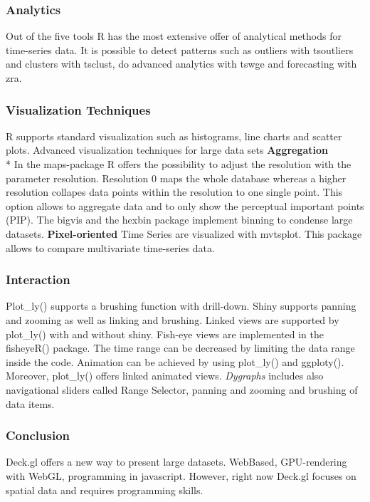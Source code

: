 \subsubsection*{Analytics}
Out of the five tools R has the most extensive offer of analytical methods for time-series data. It is possible to detect patterns such as outliers with tsoutliers\cite{Chen1993} and clusters with tsclust\cite{Manso2015}, do advanced analytics with tswge\cite{tswge} and forecasting with zra\cite{zra}.
\subsubsection*{Visualization Techniques}
R supports standard visualization such as histograms, line charts and scatter plots. Advanced visualization techniques for large data sets 
\textbf{Aggregation}\\*
In the maps-package R offers the possibility to adjust the resolution with the parameter resolution. Resolution 0 maps the whole database whereas a higher resolution collapes data points within the resolution to one single point. This option allows to aggregate data and to only show the perceptual important points (PIP).
The bigvis and the hexbin package implement binning to condense large datasets\cite{Wickham2013}.
\textbf{Pixel-oriented} Time Series are visualized with mvtsplot\cite{mvtsplot}. This package allows to compare multivariate time-series data.
\subsubsection*{Interaction}
Plot\_ly()\cite{plotly} supports a brushing function with drill-down.
Shiny supports panning and zooming as well as linking and brushing.
Linked views are supported by plot\_ly() with and without shiny. 
Fish-eye views are implemented in the fisheyeR() package. 
The time range can be decreased by limiting the data range inside the code.
Animation can be achieved by using plot\_ly() and ggploty(). Moreover, plot\_ly() offers linked animated views.
\textit{Dygraphs} includes also navigational sliders called Range Selector, panning and zooming and brushing of data items.

\subsubsection{Conclusion}
Deck.gl offers a new way to present large datasets. WebBased, GPU-rendering with WebGL, programming in javascript. However, right now Deck.gl focuses on spatial data and requires programming skills. 